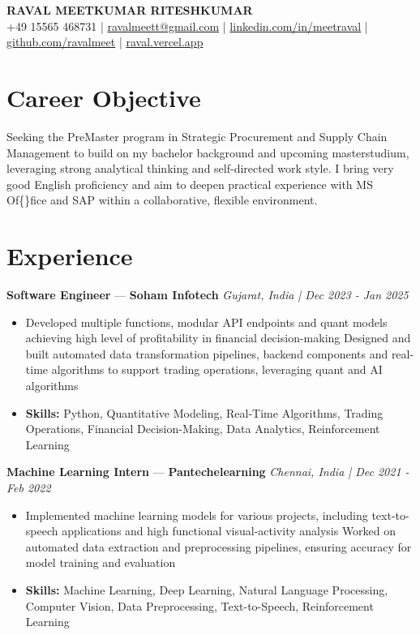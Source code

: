 \documentclass[a4paper,10pt]{article}
\begin{document}
\begin{center}
  {\Large\bfseries RAVAL MEETKUMAR RITESHKUMAR}\\[2pt]
  {\small +49 15565 468731 \;|\; \href{mailto:ravalmeett@gmail.com}{ravalmeett@gmail.com} \;|\; \href{https://www.linkedin.com/in/meetraval/}{linkedin.com/in/meetraval} \;|\; \href{https://github.com/ravalmeet}{github.com/ravalmeet} \;|\; \href{https://raval.vercel.app/}{raval.vercel.app}}
\end{center}
\vspace{-3pt}

\section*{Career Objective}
Seeking the PreMaster program in Strategic Procurement and Supply Chain Management to build on my bachelor background and upcoming masterstudium, leveraging strong analytical thinking and self-directed work style. I bring very good English proficiency and aim to deepen practical experience with MS Of\{\}fice and SAP within a collaborative, flexible environment.\par

\section*{Experience}
\textbf{Software Engineer} — \textbf{Soham Infotech} \hfill \textit{Gujarat, India \;|\; Dec 2023 - Jan 2025}\par
\vspace{1pt}
\begin{itemize}
  \item Developed multiple functions, modular API endpoints and quant models achieving high level of profitability in financial decision-making Designed and built automated data transformation pipelines, backend components and real-time algorithms to support trading operations, leveraging quant and AI algorithms
  \item \textbf{Skills:} Python, Quantitative Modeling, Real-Time Algorithms, Trading Operations, Financial Decision-Making, Data Analytics, Reinforcement Learning
\end{itemize}
\vspace{3pt}
\textbf{Machine Learning Intern} — \textbf{Pantechelearning} \hfill \textit{Chennai, India \;|\; Dec 2021 - Feb 2022}\par
\vspace{1pt}
\begin{itemize}
  \item Implemented machine learning models for various projects, including text-to-speech applications and high functional visual-activity analysis Worked on automated data extraction and preprocessing pipelines, ensuring accuracy for model training and evaluation
  \item \textbf{Skills:} Machine Learning, Deep Learning, Natural Language Processing, Computer Vision, Data Preprocessing, Text-to-Speech, Reinforcement Learning
\end{itemize}
\end{document}
